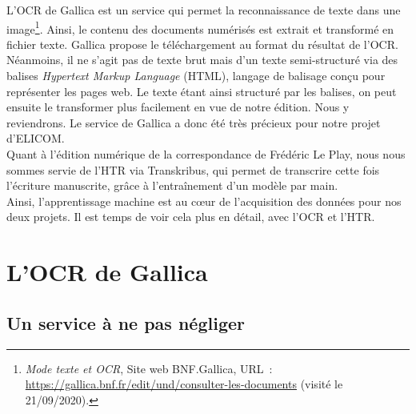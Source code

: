 L'OCR de Gallica est un service qui permet la reconnaissance de texte dans une image\footnote{\emph{Mode texte et OCR}, Site web BNF.Gallica, URL~: \url{https://gallica.bnf.fr/edit/und/consulter-les-documents} (visité le 21/09/2020).}. Ainsi, le contenu des documents numérisés est extrait et transformé en fichier texte. Gallica propose le téléchargement au format  du résultat de l'OCR. Néanmoins, il ne s'agit pas de texte brut mais d'un texte semi-structuré via des balises \emph{Hypertext Markup Language} (HTML), langage de balisage conçu pour représenter les pages web. Le texte étant ainsi structuré par les balises, on peut ensuite le transformer plus facilement en vue de notre édition. Nous y reviendrons. Le service de Gallica a donc été très précieux pour notre projet d'ELICOM. \\ 

Quant à l'édition numérique de la correspondance de Frédéric Le Play, nous nous sommes servie de l'HTR via Transkribus, qui permet de transcrire cette fois l'écriture manuscrite, grâce à l'entraînement d'un modèle par main. \\

Ainsi, l'apprentissage machine est au c\oe ur de l'acquisition des données pour nos deux projets. Il est temps de voir cela plus en détail, avec l'OCR et l'HTR.



\chapter{L'OCR de Gallica}

\section{Un service à ne pas négliger}
